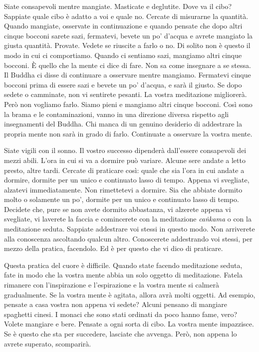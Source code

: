 Siate consapevoli mentre mangiate. Masticate e deglutite. Dove va il
cibo? Sappiate quale cibo è adatto a voi e quale no. Cercate di
misurarne la quantità. Quando mangiate, osservate in continuazione e
quando pensate che dopo altri cinque bocconi sarete sazi, fermatevi,
bevete un po' d'acqua e avrete mangiato la giusta quantità. Provate.
Vedete se riuscite a farlo o no. Di solito non è questo il modo in cui
ci comportiamo. Quando ci sentiamo sazi, mangiamo altri cinque bocconi.
È quello che la mente ci dice di fare. Non sa come insegnare a se
stessa. Il Buddha ci disse di continuare a osservare mentre mangiamo.
Fermatevi cinque bocconi prima di essere sazi e bevete un po' d'acqua, e
sarà il giusto. Se dopo sedete o camminate, non vi sentirete pesanti. La
vostra meditazione migliorerà. Però non vogliamo farlo. Siamo pieni e
mangiamo altri cinque bocconi. Così sono la brama e le contaminazioni,
vanno in una direzione diversa rispetto agli insegnamenti del Buddha.
Chi manca di un genuino desiderio di addestrare la propria mente non
sarà in grado di farlo. Continuate a osservare la vostra mente.

Siate vigili con il sonno. Il vostro successo dipenderà dall'essere
consapevoli dei mezzi abili. L'ora in cui si va a dormire può variare.
Alcune sere andate a letto presto, altre tardi. Cercate di praticare
così: quale che sia l'ora in cui andate a dormire, dormite per un unico
e continuato lasso di tempo. Appena vi svegliate, alzatevi
immediatamente. Non rimettetevi a dormire. Sia che abbiate dormito molto
o solamente un po', dormite per un unico e continuato lasso di tempo.
Decidete che, pure se non avete dormito abbastanza, vi alzerete appena
vi svegliate, vi laverete la faccia e comincerete con la meditazione
\emph{caṅkama} o con la meditazione seduta. Sappiate addestrare voi
stessi in questo modo. Non arriverete alla conoscenza ascoltando qualcun
altro. Conoscerete addestrando voi stessi, per mezzo della pratica,
facendolo. Ed è per questo che vi dico di praticare.

Questa pratica del cuore è difficile. Quando state facendo meditazione
seduta, fate in modo che la vostra mente abbia un solo oggetto di
meditazione. Fatela rimanere con l'inspirazione e l'espirazione e la
vostra mente si calmerà gradualmente. Se la vostra mente è agitata,
allora avrà molti oggetti. Ad esempio, pensate a casa vostra non appena
vi sedete? Alcuni pensano di mangiare spaghetti cinesi. I monaci che
sono stati ordinati da poco hanno fame, vero? Volete mangiare e bere.
Pensate a ogni sorta di cibo. La vostra mente impazzisce. Se è questo
che sta per succedere, lasciate che avvenga. Però, non appena lo avrete
superato, scomparirà.

